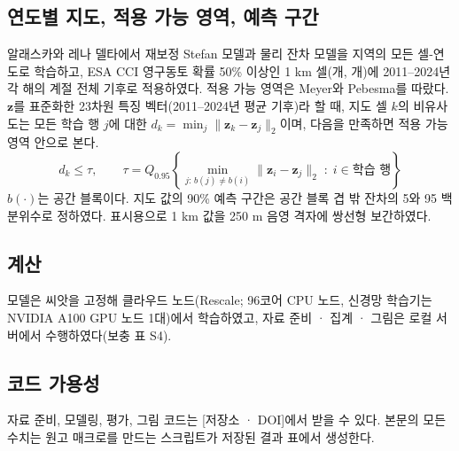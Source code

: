 \subsection{연도별 지도, 적용 가능 영역, 예측 구간}
알래스카와 레나 델타에서 재보정 Stefan 모델과 물리 잔차 모델을 지역의 모든 셀-연도로 학습하고, ESA CCI 영구동토 확률 50\% 이상인 1 km 셀(\nncellmapAk{}개, \nncellmapLe{}개)에 2011--2024년 각 해의 계절 전체 기후로 적용하였다. 적용 가능 영역은 Meyer와 Pebesma\cite{MeyerPebesma2021}를 따랐다. $\mathbf{z}$를 표준화한 23차원 특징 벡터(2011--2024년 평균 기후)라 할 때, 지도 셀 $k$의 비유사도는 모든 학습 행 $j$에 대한 $d_k = \min_{j} \lVert \mathbf{z}_k - \mathbf{z}_j \rVert_2$이며, 다음을 만족하면 적용 가능 영역 안으로 본다.
\begin{equation}
d_k \leq \tau, \qquad \tau = Q_{0.95}\!\left\{ \min_{j:\, b(j) \neq b(i)} \lVert \mathbf{z}_i - \mathbf{z}_j \rVert_2 \;:\; i \in \text{학습 행} \right\}
\label{eq:aoa}
\end{equation}
$b(\cdot)$는 공간 블록이다. 지도 값의 90\% 예측 구간은 공간 블록 겹 밖 잔차의 5와 95 백분위수로 정하였다. 표시용으로 1 km 값을 250 m 음영 격자에 쌍선형 보간하였다.

\subsection{계산}
모델은 씨앗을 고정해 클라우드 노드(Rescale; 96코어 CPU 노드, 신경망 학습기는 NVIDIA A100 GPU 노드 1대)에서 학습하였고, 자료 준비 · 집계 · 그림은 로컬 서버에서 수행하였다(보충 표 S4).

\subsection{코드 가용성}
자료 준비, 모델링, 평가, 그림 코드는 [저장소 · DOI]에서 받을 수 있다. 본문의 모든 수치는 원고 매크로를 만드는 스크립트가 저장된 결과 표에서 생성한다.
